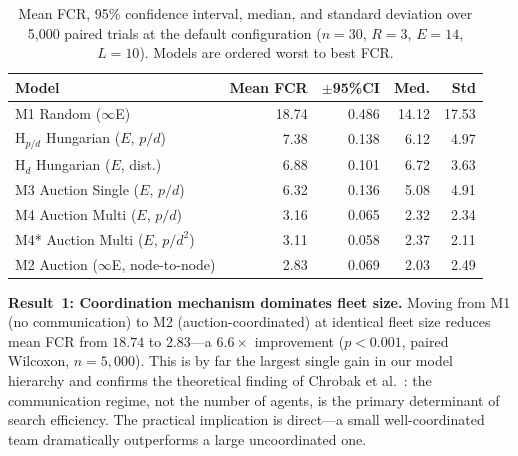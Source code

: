 \documentclass[conference]{IEEEtran}
\begin{document}
\begin{table}[ht]
\centering
\caption{Mean FCR, 95\% confidence interval, median, and standard deviation over
5,000 paired trials at the default configuration
($n{=}30$, $R{=}3$, $E{=}14$, $L{=}10$).
Models are ordered worst to best FCR.}\label{tab:main}
\vspace{2pt}
\begin{tabular}{@{}lrrrr@{}}
\toprule
\textbf{Model} & \textbf{Mean FCR} & \textbf{$\pm$95\%CI} & \textbf{Med.} & \textbf{Std} \\
\midrule
M1 Random ($\infty$E)                     & 18.74 & 0.486 & 14.12 & 17.53 \\
$\mathrm{H}_{p/d}$ Hungarian ($E$, $p/d$) &  7.38 & 0.138 &  6.12 &  4.97 \\
$\mathrm{H}_d$ Hungarian ($E$, dist.)     &  6.88 & 0.101 &  6.72 &  3.63 \\
M3 Auction Single ($E$, $p/d$)            &  6.32 & 0.136 &  5.08 &  4.91 \\
M4 Auction Multi ($E$, $p/d$)             &  3.16 & 0.065 &  2.32 &  2.34 \\
M4* Auction Multi ($E$, $p/d^2$)          &  3.11 & 0.058 &  2.37 &  2.11 \\
M2 Auction ($\infty$E, node-to-node)      &  2.83 & 0.069 &  2.03 &  2.49 \\
\bottomrule
\end{tabular}
\end{table}

\textbf{Result~1: Coordination mechanism dominates fleet size.}
Moving from M1 (no communication) to M2 (auction-coordinated) at identical
fleet size reduces mean FCR from $18.74$ to $2.83$---a $6.6\times$ improvement
($p{<}0.001$, paired Wilcoxon, $n{=}5{,}000$).
This is by far the largest single gain in our model hierarchy and confirms
the theoretical finding of Chrobak et al.~\cite{Chrobak2015}: the
communication regime, not the number of agents, is the primary determinant
of search efficiency.
The practical implication is direct---a small well-coordinated team
dramatically outperforms a large uncoordinated one.
\end{document}
